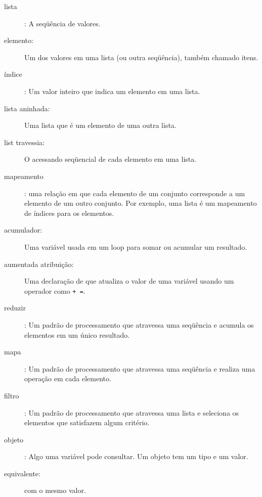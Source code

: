 \documentclass[10pt]{book}
\begin{document}
\begin{description}

\item[lista]: A seqüência de valores.

\item[elemento:] Um dos valores em uma lista (ou outra seqüência),
também chamado itens.

\item[índice]: Um valor inteiro que indica um elemento em uma lista.

\item[lista aninhada:] Uma lista que é um elemento de uma outra lista.

\item[list travessia:] O acessando seqüencial de cada elemento em uma lista.

\item[mapeamento]: uma relação em que cada elemento de um conjunto
corresponde a um elemento de um outro conjunto. Por exemplo, uma lista é
um mapeamento de índices para os elementos.

\item[acumulador:] Uma variável usada em um loop para somar ou
acumular um resultado.

\item[aumentada atribuição:] Uma declaração de que atualiza o valor
de uma variável usando um operador como \verb "+ =".

\item[reduzir]: Um padrão de processamento que atravessa uma seqüência 
e acumula os elementos em um único resultado.

\item[mapa]: Um padrão de processamento que atravessa uma seqüência e
realiza uma operação em cada elemento.

\item[filtro]: Um padrão de processamento que atravessa uma lista e
seleciona os elementos que satisfazem algum critério.

\item[objeto]: Algo uma variável pode consultar. Um objeto
tem um tipo e um valor.

\item[equivalente:] com o mesmo valor.


\end{description}
\end{document}
